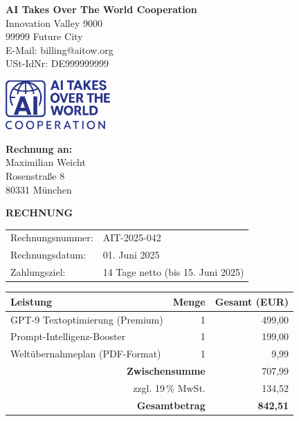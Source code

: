 \documentclass[a4paper,12pt]{article}
\begin{document}
\noindent
\begin{minipage}{0.7\textwidth}
    \textbf{\Large AI Takes Over The World Cooperation} \\
    Innovation Valley 9000 \\
    99999 Future City \\
    E-Mail: billing@aitow.org \\
    USt-IdNr: DE999999999
\end{minipage}
\begin{minipage}{0.3\textwidth}
    \flushright
    \includegraphics[width=4cm]{aitow-logo.png} %
    \vspace{0.5cm}
\end{minipage}

\vspace{1cm}

\noindent
\textbf{Rechnung an:} \\
Maximilian Weicht \\
Rosenstraße 8 \\
80331 München

\vspace{1cm}

\noindent
\textbf{\LARGE RECHNUNG} \\[0.5cm]
\begin{tabular}{@{}ll}
Rechnungsnummer: & AIT-2025-042 \\
Rechnungsdatum: & 01. Juni 2025 \\
Zahlungsziel:   & 14 Tage netto (bis 15. Juni 2025) \\
\end{tabular}

\vspace{1cm}

\begin{longtable}{|p{8cm}|r|r|}
\hline
\textbf{Leistung} & \textbf{Menge} & \textbf{Gesamt (EUR)} \\
\hline
GPT-9 Textoptimierung (Premium) & 1 & 499,00 \\
Prompt-Intelligenz-Booster & 1 & 199,00 \\
Weltübernahmeplan (PDF-Format) & 1 & 9,99 \\
\hline
\multicolumn{2}{|r|}{\textbf{Zwischensumme}} & 707,99 \\
\multicolumn{2}{|r|}{zzgl. 19\,\% MwSt.} & 134,52 \\
\hline
\multicolumn{2}{|r|}{\textbf{Gesamtbetrag}} & \textbf{842,51} \\
\hline
\end{longtable}
\end{document}
